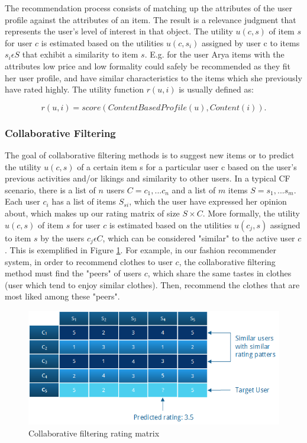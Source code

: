 The recommendation process consists of matching up the attributes of the user
profile against the attributes of an item. The result is a relevance judgment
that represents the user's level of interest in that object. The utility $u(c,
s)$ of item $s$ for user $c$ is estimated based on the utilities $u(c, s_{i})$
assigned by user c to items $s_{i} \epsilon S$ that exhibit a similarity to
item $s$. E.g. for the user Arya items with the attributes low price and low
formality could safely be recommended as they fit her user profile, and have
similar characteristics to the items which she previously have rated highly.
The utility function $r(u, i)$ is usually defined as:

\begin{equation}
r(u,i) = score(ContentBasedProfile(u), Content(i)).
\end{equation}

\subsubsection{Collaborative Filtering}
\label{subsec:cf}

The goal of collaborative filtering methods is to suggest new items or to
predict the utility $u(c, s)$ of a certain item s for a particular user c based
on the user's previous activities and/or likings and similarity to other users.
In a typical CF scenario, there is a list of $n$ users $C = {c_{1}, ... c_{n}}$
and a list of $m$ items $S = {s_{1},...s_{m}}$. Each user $c_{i}$ has a list of
items $S_{si}$, which the user have expressed her opinion about, which makes up
our rating matrix of size $S \times C$. More formally, the utility $u(c, s)$ of
item $s$ for user $c$ is estimated based on the utilities $u(c_{j}, s)$
assigned to item $s$ by the users $c_{j} \epsilon C$, which can be considered
"similar" to the active user $c$. This is exemplified in Figure
\ref{figure:ratingmatrix}. For example, in our fashion recommender system, in
order to recommend clothes to user $c$, the collaborative filtering method must
find the "peers" of users $c$, which share the same tastes in clothes (user
which tend to enjoy similar clothes). Then, recommend the clothes that are most
liked among these "peers".

\begin{figure}[H]
    \includegraphics[width=5in]{image/ratingmatrix.png}
    \centering
    \caption[Collaborative filtering rating matrix]{Collaborative filtering rating matrix}
    \label{figure:ratingmatrix}
\end{figure}


